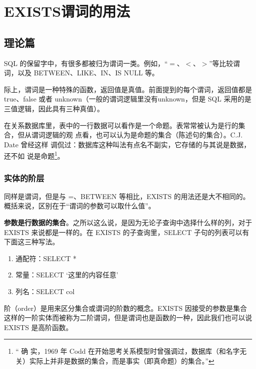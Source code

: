 \section{EXISTS谓词的用法}
\subsection{理论篇}
SQL 的保留字中，有很多都被归为谓词一类。例如，“$=$、$<$、$>$”等比较谓词，以及 BETWEEN、LIKE、IN、IS NULL 等。

际上，谓词是一种特殊的函数，返回值是真值。前面提到的每个谓词，返回值都是 true、false 或者 unknown（一般的谓词逻辑里没有unknown，但是 SQL 采用的是三值逻辑，因此具有三种真值）。

在关系数据库里，表中的一行数据可以看作是一个命题。表常常被认为是行的集合，但从谓词逻辑的观
点看，也可以认为是命题的集合（陈述句的集合）。C.J. Date 曾经这样
调侃过：数据库这种叫法有点名不副实，它存储的与其说是数据，还不如
说是命题\footnote{“ 确 实，1969 年 Codd 在开始思考关系模型时曾强调过，数据库（和名字无关）实际上并非是数据的集合，而是事实（即真命题）的集合。”}。
\subsubsection*{实体的阶层}
同样是谓词，但是与 =、BETWEEN 等相比，EXISTS 的用法还是大不相同的。概括来说，区别在于“谓词的参数可以取什么值”。


\textbf{参数是行数据的集合}。之所以这么说，是因为无论子查询中选择什么样的列，对于 EXISTS 来说都是一样的。在 EXISTS 的子查询里，SELECT 子句的列表可以有下面这三种写法。
\begin{enumerate}
    \item 通配符：SELECT *
    \item 常量：SELECT ‘这里的内容任意’
    \item 列名：SELECT col
\end{enumerate}


阶（order）是用来区分集合或谓词的阶数的概念。EXISTS 因接受的参数是集合这样的一阶实体而被称为二阶谓词，但是谓词也是函数的一种，因此我们也可以说EXISTS 是高阶函数。

